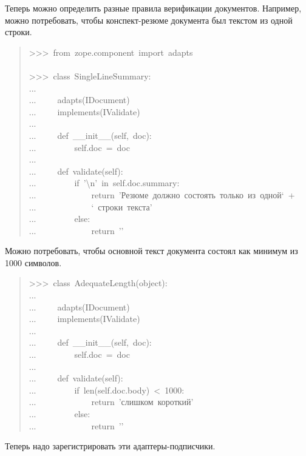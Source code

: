 \documentclass[a4paper,openany,twoside,final]{book}
\begin{document}
Теперь можно определить разные правила верификации документов.
Например, можно потребовать, чтобы конспект-резюме документа был
текстом из одной строки.

\begin{quote}{\ttfamily \raggedright \noindent
>{}>{}>~from~zope.component~import~adapts\\
~\\
>{}>{}>~class~SingleLineSummary:\\
...\\
...~~~~~adapts(IDocument)\\
...~~~~~implements(IValidate)\\
...\\
...~~~~~def~\_\_init\_\_(self,~doc):\\
...~~~~~~~~~self.doc~=~doc\\
...\\
...~~~~~def~validate(self):\\
...~~~~~~~~~if~'\textbackslash{}n'~in~self.doc.summary:\\
...~~~~~~~~~~~~~return~'Резюме~должно~состоять~только~из~одной`~+\\
...~~~~~~~~~~~~~`~строки~текста'\\
...~~~~~~~~~else:\\
...~~~~~~~~~~~~~return~'{}'
}
\end{quote}

Можно потребовать, чтобы основной текст документа состоял как минимум
из 1000 символов.

\begin{quote}{\ttfamily \raggedright \noindent
>{}>{}>~class~AdequateLength(object):\\
...\\
...~~~~~adapts(IDocument)\\
...~~~~~implements(IValidate)\\
...\\
...~~~~~def~\_\_init\_\_(self,~doc):\\
...~~~~~~~~~self.doc~=~doc\\
...\\
...~~~~~def~validate(self):\\
...~~~~~~~~~if~len(self.doc.body)~<~1000:\\
...~~~~~~~~~~~~~return~'слишком~короткий'\\
...~~~~~~~~~else:\\
...~~~~~~~~~~~~~return~'{}'
}
\end{quote}

Теперь надо зарегистрировать эти адаптеры-подписчики.
\end{document}
